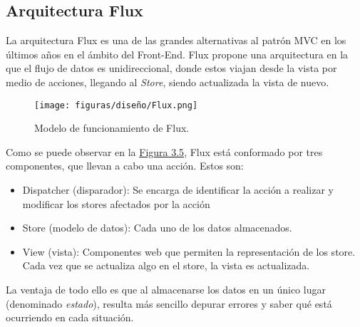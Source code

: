 \subsection{Arquitectura Flux}

La arquitectura Flux \cite{flux} es una de las grandes alternativas al patrón MVC en los últimos años en el ámbito del Front-End. Flux propone una arquitectura en la que el flujo de datos es unidireccional, donde estos viajan desde la vista por medio de acciones, llegando al {\it Store}, siendo actualizada la vista de nuevo.

\begin{figure}[H]
\centerline{\texttt{[image: figuras/diseño/Flux.png]}}
\caption{Modelo de funcionamiento de Flux.}
\label{enlaceImagenFlux}
\end{figure}

Como se puede observar en la \hyperref[enlaceImagenFlux]{Figura 3.5}, Flux está conformado por tres componentes, que llevan a cabo una acción. Estos son:
\begin{itemize}
    \item Dispatcher (disparador): Se encarga de identificar la acción a realizar y modificar los stores afectados por la acción
    \item Store (modelo de datos): Cada uno de los datos almacenados.
    \item View (vista): Componentes web que permiten la representación de los store. Cada vez que se actualiza algo en el store, la vista es actualizada.
\end{itemize}

La ventaja de todo ello es que al almacenarse los datos en un único lugar (denominado {\it estado}), resulta más sencillo depurar errores y saber qué está ocurriendo en cada situación.